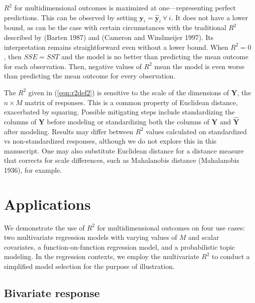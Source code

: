 \(R^2\) for multidimensional outcomes is maximized at one---representing perfect predictions. This can be observed by setting \(\boldsymbol{y}_i = \hat{\boldsymbol{y}}_i\ \forall\ i\). It does not have a lower bound, as can be the case with certain circumstances with the traditional \(R^2\) described by (Barten 1987) and (Cameron and Windmeijer 1997). Its interpretation remains straightforward even without a lower bound. When \(R^2 = 0\), then \(SSE = SST\) and the model is no better than predicting the mean outcome for each observation. Then, negative values of \(R^2\) mean the model is even worse than predicting the mean outcome for every observation.

The \(R^2\) given in (\ref{eqn:r2def2}) is sensitive to the scale of the dimensions of \(\boldsymbol{Y}\), the \(n\times M\) matrix of responses. This is a common property of Euclidean distance, exacerbated by squaring. Possible mitigating steps include standardizing the columns of \(\boldsymbol{Y}\) before modeling or standardizing both the columns of \(\boldsymbol{Y}\) and \(\hat{\boldsymbol{Y}}\) after modeling. Results may differ between \(R^2\) values calculated on standardized vs non-standardized responses, although we do not explore this in this manuscript. One may also substitute Euclidean distance for a distance measure that corrects for scale differences, such as Mahalanobis distance (Mahalanobis 1936), for example.

\hypertarget{applications}{%
\section{Applications}\label{applications}}

We demonstrate the use of \(R^2\) for multidimensional outcomes on four use cases: two multivariate regression models with varying values of \(M\) and scalar covariates, a function-on-function regression model, and a probabilistic topic modeling. In the regression contexts, we employ the multivariate \(R^2\) to conduct a simplified model selection for the purpose of illustration.

\hypertarget{bivariate-response}{%
\subsection{Bivariate response}\label{bivariate-response}}

